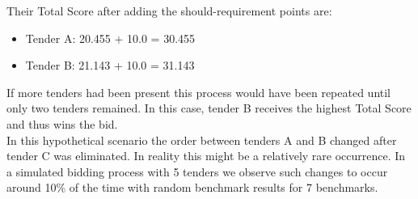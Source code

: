 \documentclass{article}
\begin{document}
Their Total Score after adding the should-requirement points are:

\begin{itemize}
    \item Tender A: 20.455 + 10.0 = 30.455
    \item Tender B: 21.143 + 10.0 = 31.143
\end{itemize}

If more tenders had been present this process would have been repeated until only two tenders remained.  In this case, tender B receives the highest Total Score and thus wins the bid.\\

In this hypothetical scenario the order between tenders A and B changed after tender C was eliminated. In reality this might be a relatively rare occurrence. In a simulated bidding process with 5 tenders we observe such changes to occur around 10\% of the time with random benchmark results for 7 benchmarks.
\end{document}
